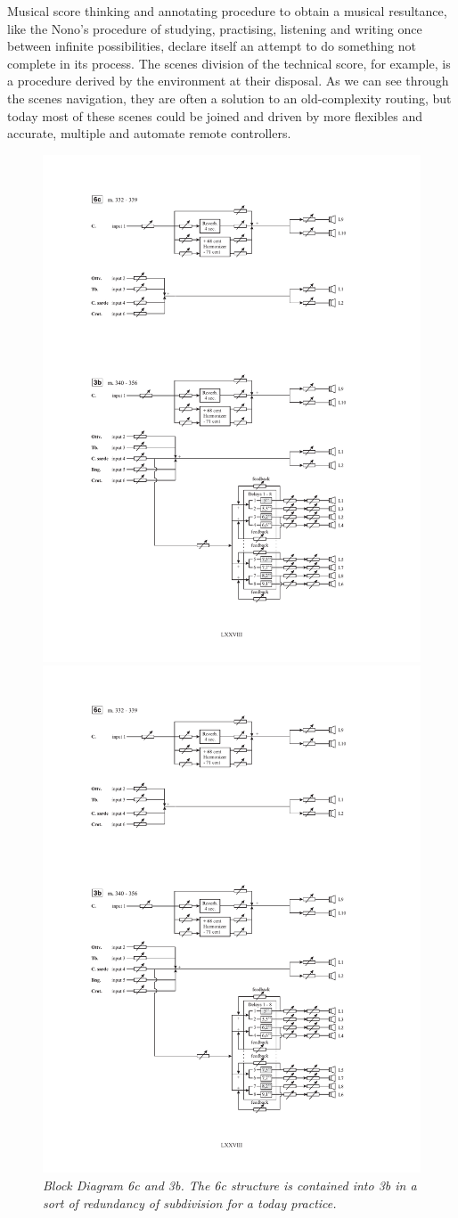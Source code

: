 \documentclass[twoside,a4paper]{article}
\begin{document}
Musical score thinking and annotating procedure to obtain a musical resultance, like the Nono's procedure of studying, practising, listening and writing once between infinite possibilities, declare itself an attempt to do something not complete in its process. The scenes division of the technical score, for example, is a procedure derived by the environment at their disposal. As we can see through the scenes navigation, they are often a solution to an old-complexity routing, but today most of these scenes could be joined and driven by more flexibles and accurate, multiple and automate remote controllers. 

\begin{figure}[ht]
\centerline{\includegraphics[width=.45\textwidth]{img/re-diagramma6c}}
\centerline{\includegraphics[width=.45\textwidth]{img/re-diagramma3b}}
\caption{\label{re-dia-6c}{\it Block Diagram 6c and 3b. The 6c structure is contained into 3b in a sort of redundancy of subdivision for a today practice.}}
\end{figure}
\end{document}
